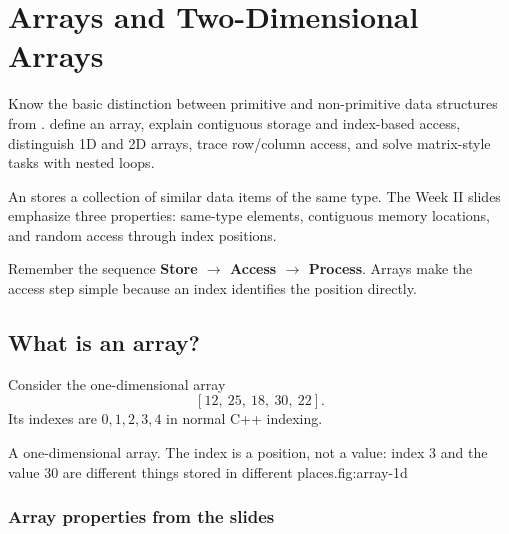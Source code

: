 \chapter{Arrays and Two-Dimensional Arrays}\label{ch:arrays}

\chapterguide%
  {Know the basic distinction between primitive and non-primitive data structures from .}
  {define an array, explain contiguous storage and index-based access, distinguish 1D and 2D arrays, trace row/column access, and solve matrix-style tasks with nested loops.}

An  stores a collection of similar data items of the same type. The Week II slides emphasize three properties: same-type elements, contiguous memory locations, and random access through index positions.

\begin{firstread}
Remember the sequence \textbf{Store $\rightarrow$ Access $\rightarrow$ Process}. Arrays make the access step simple because an index identifies the position directly.
\end{firstread}

\section{What is an array?}

Consider the one-dimensional array
\[
[12,\ 25,\ 18,\ 30,\ 22].
\]
Its indexes are $0,1,2,3,4$ in normal C++ indexing.

\begin{adsfig}{A one-dimensional array. The index is a position, not a value: index 3 and
the value 30 are different things stored in different places.}{fig:array-1d}
\end{adsfig}

\subsection{Array properties from the slides}

